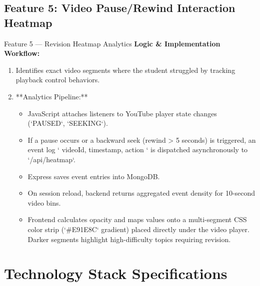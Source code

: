 \documentclass[12pt,a4paper]{article}
\begin{document}
\subsection{Feature 5: Video Pause/Rewind Interaction Heatmap}
\begin{featurebox}{Feature 5 --- Revision Heatmap Analytics}
\textbf{Logic \& Implementation Workflow:} 
\begin{enumerate}[leftmargin=1.2cm]
    \item Identifies exact video segments where the student struggled by tracking playback control behaviors.
    \item **Analytics Pipeline:**
    \begin{itemize}
        \item JavaScript attaches listeners to YouTube player state changes (`PAUSED`, `SEEKING`).
        \item If a pause occurs or a backward seek (rewind > 5 seconds) is triggered, an event log `{ videoId, timestamp, action }` is dispatched asynchronously to `/api/heatmap`.
        \item Express saves event entries into MongoDB.
        \item On session reload, backend returns aggregated event density for 10-second video bins.
        \item Frontend calculates opacity and maps values onto a multi-segment CSS color strip (`#E91E8C` gradient) placed directly under the video player. Darker segments highlight high-difficulty topics requiring revision.
    \end{itemize}
\end{enumerate}
\end{featurebox}

\section{Technology Stack Specifications}
\end{document}
